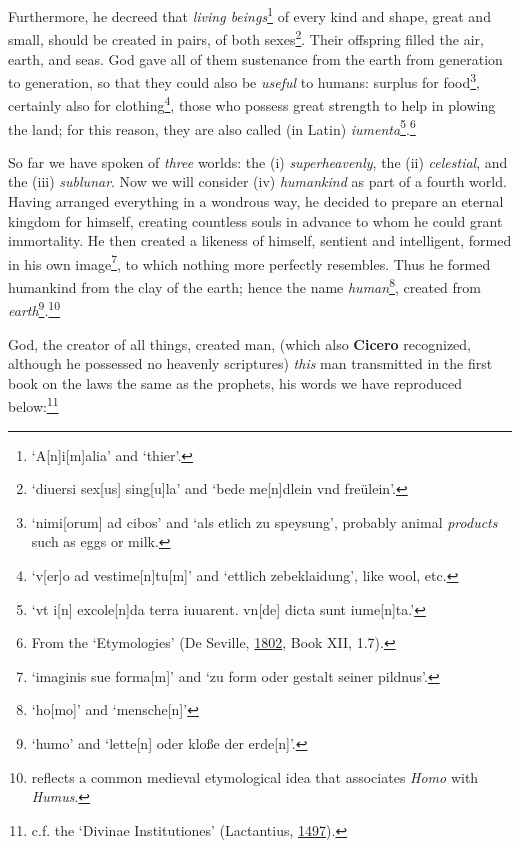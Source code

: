 \documentclass[
]{article}
\begin{document}
Furthermore, he decreed that \emph{living beings}\footnote{`A{[}n{]}i{[}m{]}alia'
  and `thier'.} of every kind and shape, great and small, should be
created in pairs, of both sexes\footnote{`diuersi sex{[}us{]}
  sing{[}u{]}la' and `bede me{[}n{]}dlein vnd freülein'.}. Their
offspring filled the air, earth, and seas. God gave all of them
sustenance from the earth from generation to generation, so that they
could also be \emph{useful} to humans: surplus for food\footnote{`nimi{[}orum{]}
  ad cibos' and `als etlich zu speysung', probably animal
  \emph{products} such as eggs or milk.}, certainly also for
clothing\footnote{`v{[}er{]}o ad vestime{[}n{]}tu{[}m{]}' and `ettlich
  zebeklaidung', like wool, etc.}, those who possess great strength to
help in plowing the land; for this reason, they are also called (in
Latin) \emph{iumenta}\footnote{`vt i{[}n{]} excole{[}n{]}da terra
  iuuarent. vn{[}de{]} dicta sunt iume{[}n{]}ta.'}.\footnote{From the
  `Etymologies' (De Seville,
  \href{https://books.google.com/books?id=wb8Z_vlSyJwC}{1802}, Book XII,
  1.7).}

So far we have spoken of \emph{three} worlds: the (i)
\emph{superheavenly}, the (ii) \emph{celestial}, and the (iii)
\emph{sublunar}. Now we will consider (iv) \emph{humankind} as part of a
fourth world. Having arranged everything in a wondrous way, he decided
to prepare an eternal kingdom for himself, creating countless souls in
advance to whom he could grant immortality. He then created a likeness
of himself, sentient and intelligent, formed in his own
image\footnote{`imaginis sue forma{[}m{]}' and `zu form oder gestalt
  seiner pildnus'.}, to which nothing more perfectly resembles. Thus he
formed humankind from the clay of the earth; hence the name
\emph{human}\footnote{`ho{[}mo{]}' and `mensche{[}n{]}'}, created from
\emph{earth}\footnote{`humo' and `lette{[}n{]} oder kloße der
  erde{[}n{]}'.}.\footnote{reflects a common medieval etymological idea
  that associates \emph{Homo} with \emph{Humus}.}

God, the creator of all things, created man, (which also \textbf{Cicero} recognized, although he possessed no heavenly scriptures) \emph{this}
man transmitted in the first book on the laws the same as the prophets,
his words we have reproduced below:\footnote{c.f. the `Divinae
  Institutiones' (Lactantius,
  \href{https://books.google.com/books?id=qGsnghsi3uUC}{1497}).}
\end{document}
